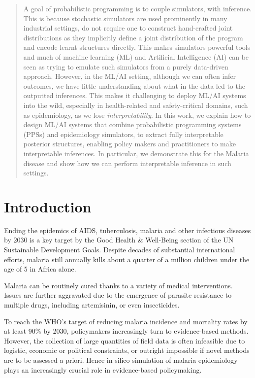\documentclass{article}
\begin{document}
\printAffiliationsAndNotice{\icmlEqualContribution} %

\begin{abstract}

A goal of probabilistic programming is to couple simulators, with inference. This is 
because stochastic simulators are used prominently in many industrial settings,
do not require one to construct hand-crafted joint distributions as they implicitly 
define a joint distribution of the program and encode learnt structures 
directly. This makes simulators powerful tools and much of machine learning (ML) and 
Artificial Intelligence (AI)
can be seen as trying to emulate such simulators from a purely data-driven approach.
However, in the 
ML/AI setting, although we can often infer outcomes, we have little understanding about what 
in the data led to the outputted inferences. 
This makes it challenging to deploy ML/AI systems into the wild, especially in health-related and safety-critical domains, such
as epidemiology, as we lose \emph{interpretability}. 
In this work, we explain how to design ML/AI systems that combine
probabilistic programming systems (PPSs) and epidemiology simulators, to extract
fully interpretable posterior structures, enabling policy makers 
and practitioners to make interpretable inferences. 
In particular, we demonstrate this for the Malaria disease and show how we can 
perform interpretable inference in such settings.
\end{abstract}

\section{Introduction}
Ending the epidemics of AIDS, tuberculosis, malaria and other infectious diseases by 2030 is a key target by the Good Health \& Well-Being section of the UN Sustainable Development Goals. Despite decades of substantial international efforts, malaria still annually kills about a quarter of a million children under the age of 5 in Africa alone.

Malaria can be routinely cured thanks to a variety of medical interventions. 
Issues are further aggravated due to the emergence of parasite resistance to multiple drugs, including artemisinin, or even insecticides.

To reach the WHO’s target of reducing malaria incidence and mortality rates by at least 90\% by 2030, policymakers increasingly turn to evidence-based methods. However, the collection of large quantities of field data is often infeasible due to logistic, economic or political constraints, or outright impossible if novel methods are to be assessed a priori. Hence in silico simulation of malaria epidemiology plays an increasingly crucial role in evidence-based policymaking.
\end{document}
